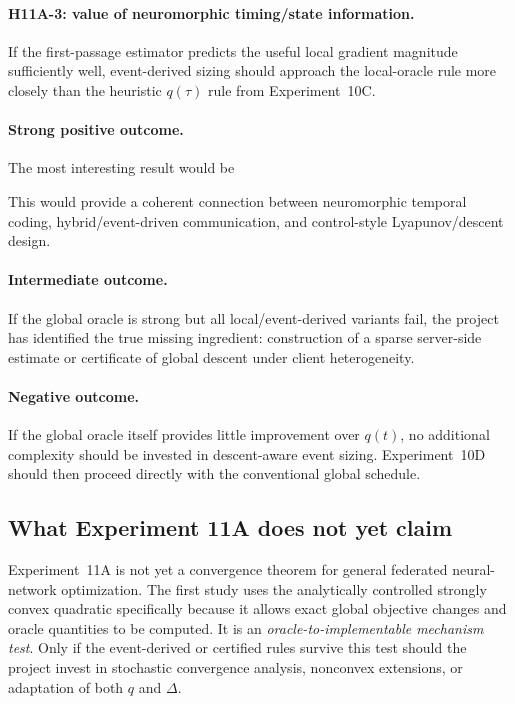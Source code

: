 \paragraph{H11A-3: value of neuromorphic timing/state information.}
If the first-passage estimator predicts the useful local gradient magnitude sufficiently well, event-derived sizing should approach the local-oracle rule more closely than the heuristic $q(\tau)$ rule from Experiment~10C.

\paragraph{Strong positive outcome.}
The most interesting result would be
\begin{center}
\end{center}
This would provide a coherent connection between neuromorphic temporal coding, hybrid/event-driven communication, and control-style Lyapunov/descent design.

\paragraph{Intermediate outcome.}
If the global oracle is strong but all local/event-derived variants fail, the project has identified the true missing ingredient: construction of a sparse server-side estimate or certificate of global descent under client heterogeneity.

\paragraph{Negative outcome.}
If the global oracle itself provides little improvement over $q(t)$, no additional complexity should be invested in descent-aware event sizing. Experiment~10D should then proceed directly with the conventional global schedule.

\subsection{What Experiment 11A does not yet claim}

Experiment~11A is not yet a convergence theorem for general federated neural-network optimization. The first study uses the analytically controlled strongly convex quadratic specifically because it allows exact global objective changes and oracle quantities to be computed. It is an \emph{oracle-to-implementable mechanism test}. Only if the event-derived or certified rules survive this test should the project invest in stochastic convergence analysis, nonconvex extensions, or adaptation of both $q$ and $\Delta$.
